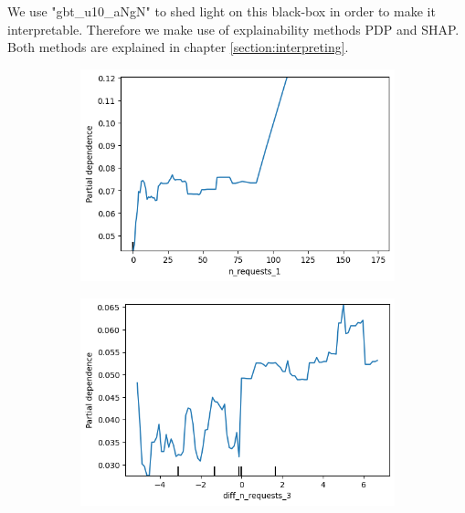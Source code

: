 \documentclass[12pt,titlepage]{article}
\begin{document}
We use "gbt\_u10\_aNgN" to shed light on this black-box in order to make it interpretable. Therefore we make use of explainability methods PDP and SHAP. Both methods are explained in chapter \ref{section:interpreting}. \\
\noindent
\begin{figure}[h!]
\centering
    \begin{subfigure}{.55\textwidth}
      \centering
      \includegraphics[width=1\linewidth]{pdp_n_requests_1.png}
    \end{subfigure}%
    \begin{subfigure}{.55\textwidth}
      \centering
      \includegraphics[width=1\linewidth]{pdp_diff_n_requests_3.png}
    \end{subfigure} \\
    \begin{subfigure}{.55\textwidth}
        \centering

\end{subfigure}
\end{figure}
\end{document}
